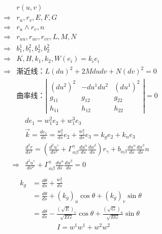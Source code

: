 \documentclass{ctexart}
\begin{document}
	\begin{minipage}[t]{.5\textwidth}
	\centering
\begin{equation*}
\begin{aligned}
&r(u,v)\\
\Rightarrow&r_u,r_v,E,F,G\\
\Rightarrow&r_u \wedge r_v,n\\
\Rightarrow&r_{uu},r_{uv},r_{vv},L,M,N\\
\Rightarrow&b_1^1,b_1^2,b_2^1,b_2^2\\
\Rightarrow&K,H,k_1,k_2,W(e_i)=k_ie_i\\
\Rightarrow&\text{渐近线：}L(du)^2+2Mdudv+N(dv)^2=0\\
&\text{曲率线：}\left|\begin{matrix}
(du^2)^2 & -du^1du^2 & (du^1)^2 \\
g_{11} & g_{12} & g_{22}\\
h_{11} & h_{12} & h_{22}
\end{matrix}\right|=0
\end{aligned}
\end{equation*}
\begin{equation*}
\begin{aligned}
&de_1=w_1^2e_2+w_1^3e_3\\
&\vec{k}=\frac{de_1}{ds}=\frac{w_1^2}{ds}e_2+\frac{w_1^3}{ds}e_3=k_ge_2+k_ne_3\\
&\frac{d^2r}{ds^2}=\left(\frac{d^2u^{\gamma}}{ds^2}+\Gamma_{\alpha \beta}^{\gamma}\frac{du^{\alpha}}{ds}\frac{du^{\beta}}{ds}\right)r_{\gamma}+b_{\alpha \beta}\frac{du^{\alpha}}{ds}\frac{du^{\beta}}{ds}n\\
\Rightarrow&\frac{d^2u^{\gamma}}{ds^2}+\Gamma_{\alpha \beta}^{\gamma}\frac{du^{\alpha}}{ds}\frac{du^{\beta}}{ds}=0\\
\end{aligned}
\end{equation*}
\begin{equation*}
\begin{aligned}
k_g&=\frac{d\theta}{ds}+\frac{w_1^2}{ds}\\
&=\frac{d\theta}{ds}+(k_g)_u \cos \theta+(k_g)_v \sin \theta\\
&=\frac{d\theta}{ds}-\frac{(\sqrt{E})_v}{\sqrt{EG}}\cos \theta + \frac{(\sqrt{G})_u}{\sqrt{EG}}\sin \theta
\end{aligned}
\end{equation*}
\begin{equation*}
\begin{aligned}
&I=w^1w^1+w^2w^2\\

\end{aligned}
\end{equation*}
\end{minipage}
\end{document}
